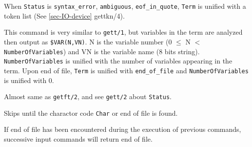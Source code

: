 \begin{itemize}
When \verb|Status| is \verb|syntax_error|, \verb|ambiguous|,
\verb|eof_in_quote|, \verb|Term| is unified with a token list
(See \ref{sec-IO-device} gettkn/4).

This command is very similar to \verb|gett/1|, but variables in the term
are analyzed then output as \verb|$VAR(N,VN)|.
N is the variable number (0 $\leq$ N $<$ \verb|NumberOfVariables|)
and VN is the variable name (8 bits string).
\verb|NumberOfVariables| is unified
with the number of variables appearing in the term. Upon end of file,
\verb|Term| is unified with \verb|end_of_file| and \verb|NumberOfVariables|
is unified with 0.

Almost same as \verb|getft/2|, and see \verb|gett/2| about \verb|Status|.

Skips until the charactor code \verb|Char| or end of file is found.\\

\end{itemize}
\Caution If end of file has been encountered during the execution of previous
commands, successive input commands will return end of file.
\vspace{1ex}

